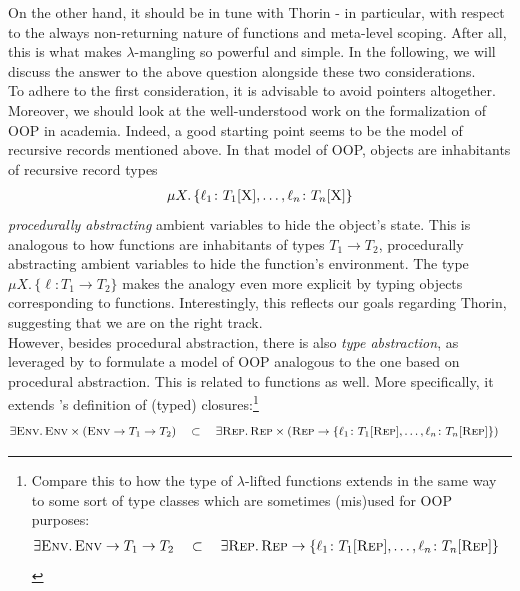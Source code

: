On the other hand, it should be in tune with Thorin - in particular, with respect to the always non-returning nature of functions and meta-level scoping.
After all, this is what makes $\lambda$-mangling so powerful and simple.
In the following, we will discuss the answer to the above question alongside these two considerations.
\\
To adhere to the first consideration, it is advisable to avoid pointers altogether.
Moreover, we should look at the well-understood work on the formalization of OOP in academia.
Indeed, a good starting point seems to be the model of recursive records mentioned above.
In that model of OOP, objects are inhabitants of recursive record types
\begin{align*}
  \mu X
  .\,
  \lbrace
    \ell_{1} \colon T_{1}[\textsc{X}],
    \ldots,
    \ell_{n} \colon T_{n}[\textsc{X}]
  \rbrace
\end{align*}
\emph{procedurally abstracting} ambient variables to hide the object's state.
This is analogous to how functions are inhabitants of types $T_{1} \to T_{2}$, procedurally abstracting ambient variables to hide the function's environment.
The type $\mu X.\, \lbrace \ell \colon T_{1} \to T_{2} \rbrace$ makes the analogy even more explicit by typing objects corresponding to functions.
Interestingly, this reflects our goals regarding Thorin, suggesting that we are on the right track.
\\
However, besides procedural abstraction, there is also \emph{type abstraction}, as leveraged by \citet{PierceTurner92} to formulate a model of OOP analogous to the one based on procedural abstraction.
This is related to functions as well.
More specifically, it extends \citet{10.1145/237721.237791}'s definition of (typed) closures:\footnote{
  Compare this to how the type of $\lambda$-lifted functions extends in the same way to some sort of type classes which are sometimes (mis)used for OOP purposes:
\begin{align*}
  \exists
  \textsc{Env}
  .\,
  \textsc{Env} \to T_{1} \to T_{2}
  \quad
  &\subset
  \quad
  \exists
  \textsc{Rep}
  .\,
  \textsc{Rep}
  \to
  \lbrace
    \ell_{1} \colon T_{1}[\textsc{Rep}],
    \ldots,
    \ell_{n} \colon T_{n}[\textsc{Rep}]
  \rbrace
\end{align*}
}
\begin{align*}
  \exists
  \textsc{Env}
  .\,
  \textsc{Env}
  \times
  \left(
    \textsc{Env} \to T_{1} \to T_{2}
  \right)
  \quad
  &\subset
  \quad
  \exists
  \textsc{Rep}
  .\,
  \textsc{Rep}
  \times
  \left(
    \textsc{Rep}
    \to
    \lbrace
      \ell_{1} \colon T_{1}[\textsc{Rep}],
      \ldots,
      \ell_{n} \colon T_{n}[\textsc{Rep}]
    \rbrace
  \right)
\end{align*}
